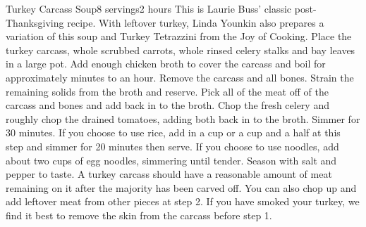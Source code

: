 \begin{recipe}{Turkey Carcass Soup}{8 servings}{2 hours}
\freeform This  is Laurie Buss' classic post-Thanksgiving recipe. With leftover turkey, Linda Younkin also prepares a variation of this soup and Turkey Tetrazzini from the Joy of Cooking.
Place the turkey carcass, whole scrubbed carrots, whole rinsed celery stalks and bay leaves in a large pot. Add enough chicken broth to cover the carcass and boil for approximately \unit[45]{minutes} to an hour.
\newstep Remove the carcass and all bones. Strain the remaining solids from the broth and reserve. Pick all of the meat off of the carcass and bones and add back in to the broth.
Chop the fresh celery and roughly chop the drained tomatoes, adding both back in to the broth. Simmer for 30 minutes.
If you choose to use rice, add in a cup or a cup and a half at this step and simmer for 20 minutes then serve. If you choose to use noodles, add about two cups of egg noodles, simmering until tender. Season with salt and pepper to taste.
\freeform A turkey carcass should have a reasonable amount of meat remaining on it after the majority has been carved off. You can also chop up and add leftover meat from other pieces at step 2. If you have smoked your turkey, we find it best to remove the skin from the carcass before step 1.
\end{recipe}
